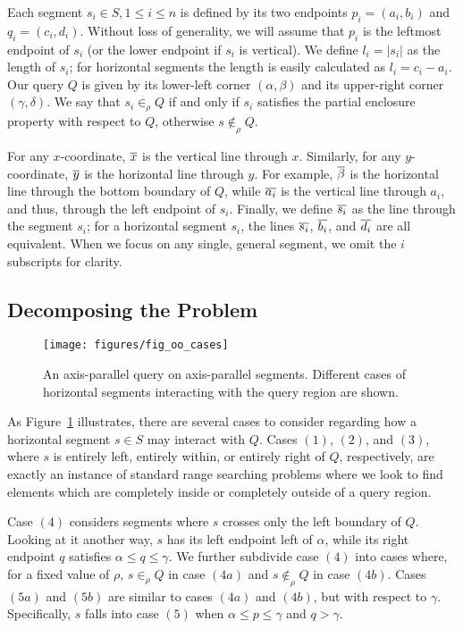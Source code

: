 Each segment $s_i \in S, 1 \leq i \leq n$ is defined by its two endpoints $p_i = (a_i, b_i)$ and $q_i = (c_i, d_i)$. 
Without loss of generality, we will assume that $p_i$ is the leftmost endpoint of $s_i$ (or the lower endpoint if $s_i$ is vertical). 
We define $l_i = |s_i|$ as the length of $s_i$; for horizontal segments the length is easily calculated as $l_i = c_i - a_i$. 
Our query $Q$ is given by its lower-left corner $(\alpha, \beta)$ and its upper-right corner $(\gamma, \delta)$. 
We say that $s_i \in_\rho Q$ if and only if $s_i$ satisfies the partial enclosure property with respect to $Q$, otherwise $s \not \in_\rho Q$.

For any $x$-coordinate, $\overline{x}$ is the vertical line through $x$. Similarly, for any $y$-coordinate, $\overline{y}$ is the horizontal line through $y$. For example, $\overline{\beta}$ is the horizontal line through the bottom boundary of $Q$, while $\overline{a_i}$ is the vertical line through $a_i$, and thus, through the left endpoint of $s_i$. Finally, we define $\overline{s_i}$ as the line through the segment $s_i$; for a horizontal segment $s_i$, the lines $\overline{s_i}$, $\overline{b_i}$, and $\overline{d_i}$ are all equivalent. When we focus on any single, general segment, we omit the $i$ subscripts for clarity.


\subsection{Decomposing the Problem}
\label{:rectangles:ap:approach}

\begin{figure}[t]
\centering
\texttt{[image: figures/fig\_oo\_cases]}
\caption[The different cases of axis-parallel segments.]{An axis-parallel query on axis-parallel segments. Different cases of horizontal segments interacting with the query region are shown.}
\label{:fig:rectangles:ap:cases}
\end{figure}

As Figure~\ref{:fig:rectangles:ap:cases} illustrates, there are several cases to consider regarding how a horizontal segment $s \in S$ may interact with $Q$. Cases $(1)$, $(2)$, and $(3)$, where $s$ is entirely left, entirely within, or entirely right of $Q$, respectively, are exactly an instance of  standard range searching problems where we look to find elements which are completely inside or completely outside of a query region.  

Case $(4)$ considers segments where $s$ crosses only the left boundary of $Q$. 
Looking at it another way, $s$ has its left endpoint left of $\alpha$, while its right endpoint $q$ satisfies $\alpha \leq q \leq \gamma$.  
We further subdivide case $(4)$ into cases where, for a fixed value of $\rho$, $s \in_\rho Q$ in case $(4a)$ and $s \not \in_\rho Q$ in case $(4b)$.
Cases $(5a)$ and $(5b)$ are similar to cases $(4a)$ and $(4b)$, but with respect to $\gamma$. 
Specifically, $s$ falls into case $(5)$ when $\alpha \leq p \leq \gamma$ and $q > \gamma$. 

